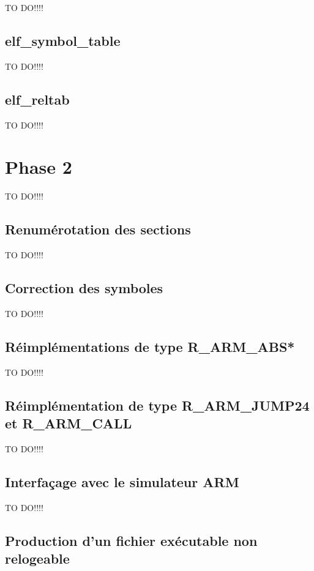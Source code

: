 \documentclass[a4paper]{article} %
\begin{document}
TO DO!!!!


\subsection{elf\_symbol\_table}
\label{sec:symbol}

TO DO!!!!


\subsection{elf\_reltab}
\label{sec:relocation}

TO DO!!!!


\section{Phase 2}
\label{sec:phase2}
TO DO!!!!

\subsection{Renumérotation des sections}
TO DO!!!!

\subsection{Correction des symboles}
TO DO!!!!

\subsection{Réimplémentations de type R\_ARM\_ABS*}
TO DO!!!!

\subsection{Réimplémentation de type R\_ARM\_JUMP24 et R\_ARM\_CALL}
TO DO!!!!

\subsection{Interfaçage avec le simulateur ARM}
TO DO!!!!

\subsection{Production d’un fichier exécutable non relogeable}
\end{document}
